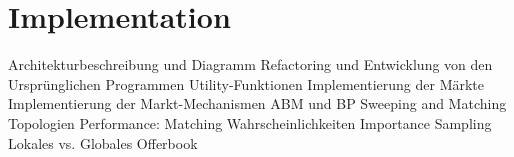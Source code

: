 \documentclass[Bachelorarbeit.tex]{subfiles}
\begin{document}
\chapter{Implementation}
Architekturbeschreibung und Diagramm
	Refactoring und Entwicklung von den Ursprünglichen Programmen
	Utility-Funktionen
	Implementierung der Märkte
	Implementierung der Markt-Mechanismen ABM und BP
	Sweeping and Matching 
	Topologien
	Performance:
		Matching Wahrscheinlichkeiten
		Importance Sampling
		Lokales vs. Globales Offerbook
\end{document}
